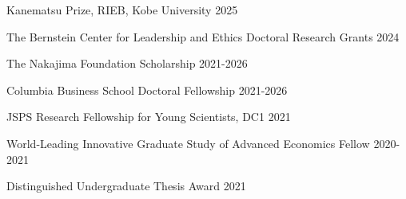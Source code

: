 
\begin{cventries}

\cventrysimple
    {Kanematsu Prize, RIEB, Kobe University}  %
    {2025} %
    {}
	
\cventrysimple
    {The Bernstein Center for Leadership and Ethics Doctoral Research Grants}  %
    {2024} %
    {}
	
\cventrysimple
    {The Nakajima Foundation Scholarship}  %
    {2021-2026} %
    {}
	
\cventrysimple
    {Columbia Business School Doctoral Fellowship}  %
    {2021-2026} %
    {}
	
\cventrysimple
	{JSPS Research Fellowship for Young Scientists, DC1}  %
    {2021} %
    {}

\cventrysimple
	{World-Leading Innovative Graduate Study of Advanced Economics Fellow}  %
    {2020-2021} %
    {}

\cventrysimple
    {Distinguished Undergraduate Thesis Award}  %
    {2021} %
    {}

\end{cventries}
